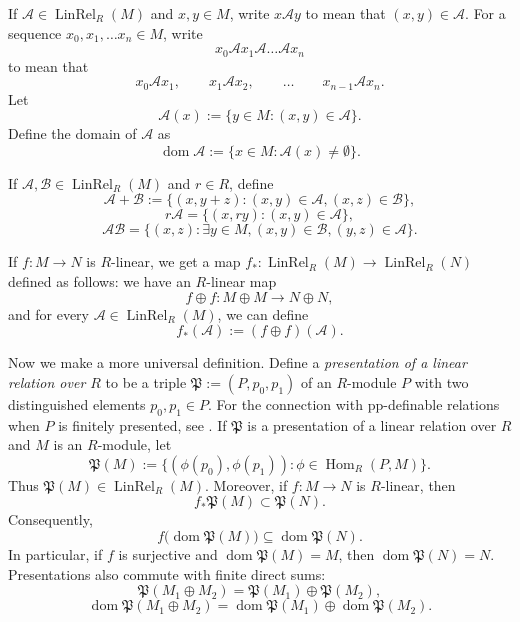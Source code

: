 \documentclass[11pt]{article}
\newcommand{\Hom}{\operatorname{Hom}}
\theoremstyle{plain}
\theoremstyle{definition}
\theoremstyle{remark}
\numberwithin{equation}{section}
\begin{document}
If $\mathcal A \in \operatorname{LinRel}_R(M)$ and $x,y \in M$, write $x \mathcal A y$ to mean that $(x,y) \in \mathcal A$. For a sequence $x_0, x_1, \ldots x_n \in M$, write \[x_0 \mathcal A x_1 \mathcal A \ldots \mathcal A x_n\] to mean that \[x_0 \mathcal A x_1, \qquad x_1 \mathcal A x_2, \qquad \ldots \qquad x_{n-1} \mathcal A x_n.\] Let \[\mathcal A(x) := \{y \in M: (x, y) \in \mathcal{A}\}.\] Define the domain of $\mathcal A$ as \[\operatorname{dom}\mathcal A := \{x \in M: \mathcal A(x) \not = \emptyset\}.\]

If $\mathcal A, \mathcal B \in \operatorname{LinRel}_R(M)$ and $r \in R$, define \[\mathcal A + \mathcal B := \{(x,y+z): (x,y) \in \mathcal A, (x,z) \in \mathcal B\},\] \[r \mathcal A = \{(x,ry): (x,y) \in \mathcal A\},\] \[\mathcal A \mathcal B = \{(x,z): \exists y \in M, (x,y) \in \mathcal B, (y,z) \in \mathcal A\}.\] 

If $f: M \rightarrow N$ is $R$-linear, we get a map $f_\ast: \operatorname{LinRel}_R(M) \rightarrow \operatorname{LinRel}_R(N)$ defined as follows: we have an $R$-linear map \[f \oplus f: M \oplus M \rightarrow N \oplus N,\] and for every $\mathcal A \in \operatorname{LinRel}_R(M)$, we can define \[f_\ast(\mathcal A) := (f \oplus f )(\mathcal A).\]

Now we make a more universal definition. Define a \emph{presentation of a linear relation over $R$} to be a triple $\mathfrak P := (P, p_0, p_1)$ of an $R$-module $P$ with two distinguished elements $p_0, p_1 \in P$. For the connection with pp-definable relations when \(P\) is finitely presented, see \cite{Prest2009}. If $\mathfrak P$ is a presentation of a linear relation over $R$ and $M$ is an $R$-module, let \[\mathfrak P(M) := \{(\phi(p_0), \phi(p_1)): \phi \in \Hom_R(P, M)\}.\] Thus $\mathfrak P(M) \in \operatorname{LinRel}_R(M)$. Moreover, if $f: M \rightarrow N$ is $R$-linear, then \[f_\ast \mathfrak P(M) \subset \mathfrak P(N).\] Consequently, \[ f\bigl(\operatorname{dom}\mathfrak P(M)\bigr) \subseteq \operatorname{dom}\mathfrak P(N). \] In particular, if \(f\) is surjective and \(\operatorname{dom}\mathfrak P(M)=M\), then \(\operatorname{dom}\mathfrak P(N)=N\). Presentations also commute with finite direct sums: \[ \mathfrak P(M_1\oplus M_2) = \mathfrak P(M_1)\oplus\mathfrak P(M_2), \] \[\operatorname{dom}\mathfrak P(M_1 \oplus M_2) = \operatorname{dom}\mathfrak{P}(M_1) \oplus \operatorname{dom} \mathfrak P(M_2).\] 
\end{document}
